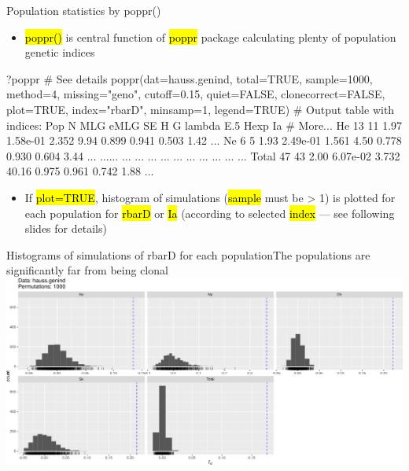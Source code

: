 \documentclass[compress, ucs, xelatex, 11pt, xcolor=svgnames,
	hyperref={
		bookmarks=true,
		unicode=true,
		colorlinks=true,
		pdftitle={Molecular data in R},
		plainpages=false,
		pdfauthor={Vojtech Zeisek},
		pdfsubject={Course about phylogeny and evolution in R},
		pdfcreator={XeLaTeX},
		pdfkeywords={R, evolution, phylogeny, molecular data},
		linkcolor=Tomato,
		anchorcolor=SaddleBrown,
		citecolor=Goldenrod,
		filecolor=DarkMagenta,
		menucolor=Sienna,
		urlcolor=DarkTurquoise,
		pdftex},
	url={hyphens, lowtilde} %
	]{beamer}
\renewcommand{\texttt}[1]{\hl{\ttfamily #1}}
\begin{document}
\begin{frame}[fragile]{Population statistics by poppr()}
	\vfill
	\begin{itemize}
		\item \texttt{poppr()} is central function of \texttt{poppr} package calculating plenty of population genetic indices
	\end{itemize}
	\vfill
	\begin{spluscode}
    ?poppr # See details
    poppr(dat=hauss.genind, total=TRUE, sample=1000, method=4,
      missing="geno", cutoff=0.15, quiet=FALSE, clonecorrect=FALSE,
      plot=TRUE, index="rbarD", minsamp=1, legend=TRUE)
    # Output table with indices:
      Pop  N MLG eMLG       SE     H     G lambda   E.5  Hexp   Ia # More...
       He 13  11 1.97 1.58e-01 2.352  9.94  0.899 0.941 0.503 1.42 ...
       Ne  6   5 1.93 2.49e-01 1.561  4.50  0.778 0.930 0.604 3.44 ...
      ...... ...  ...      ...   ...   ...    ...   ...   ...  ... ...
    Total 47  43 2.00 6.07e-02 3.732 40.16  0.975 0.961 0.742 1.88 ...
	\end{spluscode}
	\vfill
	\begin{itemize}
		\item If \texttt{plot=TRUE}, histogram of simulations (\texttt{sample} must be > 1) is plotted for each population for \texttt{rbarD} or \texttt{Ia} (according to selected \texttt{index} --- see following slides for details)
	\end{itemize}
	\vfill
\end{frame}

\begin{frame}{Histograms of simulations of rbarD for each population}{The populations are significantly far from being clonal}
	\includegraphics[width=\textwidth]{poppr.png}
\end{frame}
\end{document}
